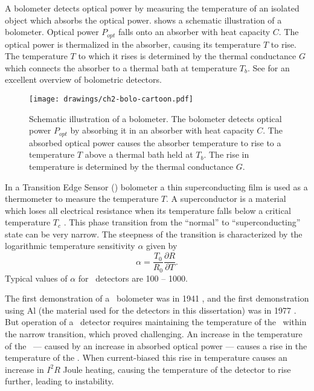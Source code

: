 A bolometer detects optical power by measuring the temperature of an isolated object which absorbs the optical power.
 shows a schematic illustration of a bolometer.
Optical power $P_{opt}$ falls onto an absorber with heat capacity $C$.
The optical power is thermalized in the absorber, causing its temperature $T$ to rise.
The temperature $T$ to which it rises is determined by the thermal conductance $G$ which connects the absorber to a thermal bath at temperature $T_b$.
See \cite{richards_bolometers_1994} for an excellent overview of bolometric detectors.

\begin{figure*}
\centering
\texttt{[image: drawings/ch2-bolo-cartoon.pdf]}
\caption[Bolometer schematic]{
  Schematic illustration of a bolometer.
  The bolometer detects optical power $P_{opt}$ by absorbing it in an absorber with heat capacity $C$.
  The absorbed optical power causes the absorber temperature to rise to a temperature $T$ above a thermal bath held at $T_b$.
  The rise in temperature is determined by the thermal conductance $G$.
}
\label{fig:ch2-bolo-cartoon}
\end{figure*}

In a Transition Edge Sensor (\TES) bolometer a thin superconducting film is used as a thermometer to measure the temperature $T$.
A superconductor is a material which loses all electrical resistance when its temperature falls below a critical temperature $T_c$ \cite{tinkham_introduction_1996}.
This phase transition from the ``normal'' to ``superconducting'' state can be very narrow.
The steepness of the transition is characterized by the logarithmic temperature sensitivity $\alpha$ given by
\begin{equation}
  \alpha = \frac{T_0}{R_0} \frac{\partial R}{\partial T}.
\end{equation}
Typical values of $\alpha$ for \TES\ detectors are 100 -- 1000.

The first demonstration of a \TES\ bolometer was in 1941 \cite{andrews_attenuated_1942}, and the first demonstration using Al (the material used for the detectors in this dissertation) was in 1977 \cite{clarke_superconductive_1977}.
But operation of a \TES\ detector requires maintaining the temperature of the \TES\ within the narrow transition, which proved challenging.
An increase in the temperature of the \TES\ --- caused by an increase in absorbed optical power --- causes a rise in the temperature of the \TES.
When current-biased this rise in temperature causes an increase in $I^2 R$ Joule heating, causing the temperature of the detector to rise further, leading to instability.

